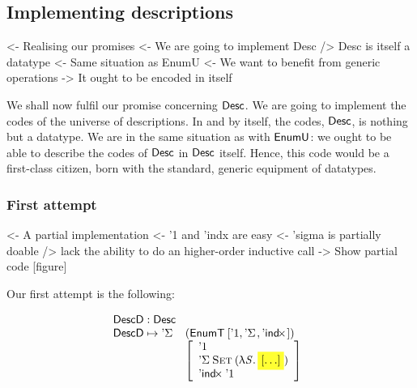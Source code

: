\subsection{Implementing descriptions}

\begin{wstructure}
<- Realising our promises
    <- We are going to implement Desc
    /> Desc is itself a datatype
        <- Same situation as EnumU
            <- We want to benefit from generic operations
        -> It ought to be encoded in itself
\end{wstructure}

We shall now fulfil our promise concerning $\Desc$. We are going to
implement the codes of the universe of descriptions. In and by itself,
the codes, $\Desc$, is nothing but a datatype. We are in the same
situation as with $\EnumU$: we ought to be able to describe the codes
of $\Desc$ in $\Desc$ itself. Hence, this code would be a first-class
citizen, born with the standard, generic equipment of datatypes.

\subsubsection{First attempt}

\begin{wstructure}
<- A partial implementation
    <- '1 and 'indx are easy
    <- 'sigma is partially doable
        /> lack the ability to do an higher-order inductive call
    -> Show partial code [figure]
\end{wstructure}

Our first attempt is the following:

\[\stk{
\DescD : \Desc \\
\begin{array}{@{}ll}
\DescD \mapsto \DSigma{\!}{\!} & (\EnumT{[ \DUnit, \DSigma{\!}{\!}, \DIndx{\!} ]})  \\
                               & \left[\begin{array}{l}
                                   \DUnit                                \\
                                   \DSigma{\Set}{(\LAM{\V{S}} \SHED)}      \\
                                   \DIndx{\DUnit}                        \\
                                 \end{array}
                                 \right]
\end{array}
}\]

